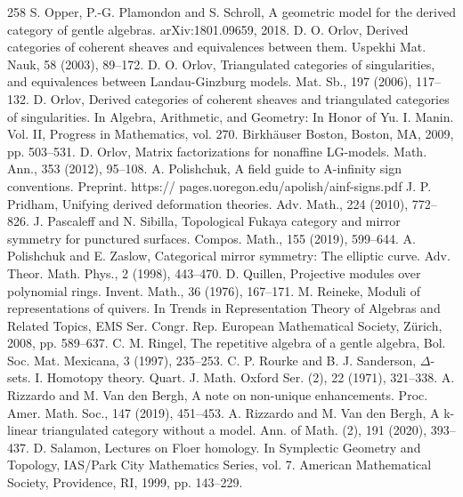 \begin{thebibliography}{258}
\hypertarget{ref:197}{} S. Opper, P.-G. Plamondon and S. Schroll, A geometric model for the derived category of gentle algebras. arXiv:1801.09659, 2018.
\hypertarget{ref:198}{} D. O. Orlov, Derived categories of coherent sheaves and equivalences between them. Uspekhi Mat. Nauk, 58 (2003), 89–172.
\hypertarget{ref:199}{} D. O. Orlov, Triangulated categories of singularities, and equivalences between Landau-Ginzburg models. Mat. Sb., 197 (2006), 117–132.
\hypertarget{ref:200}{} D. Orlov, Derived categories of coherent sheaves and triangulated categories of singularities. In Algebra, Arithmetic, and Geometry: In Honor of Yu. I. Manin. Vol. II, Progress in Mathematics, vol. 270. Birkhäuser Boston, Boston, MA, 2009, pp. 503–531.
\hypertarget{ref:201}{} D. Orlov, Matrix factorizations for nonaffine LG-models. Math. Ann., 353 (2012), 95–108.
\hypertarget{ref:202}{} A. Polishchuk, A field guide to A-infinity sign conventions. Preprint. https:// pages.uoregon.edu/apolish/ainf-signs.pdf
\hypertarget{ref:203}{} J. P. Pridham, Unifying derived deformation theories. Adv. Math., 224 (2010), 772–826.
\hypertarget{ref:204}{} J. Pascaleff and N. Sibilla, Topological Fukaya category and mirror symmetry for punctured surfaces. Compos. Math., 155 (2019), 599–644.
\hypertarget{ref:205}{} A. Polishchuk and E. Zaslow, Categorical mirror symmetry: The elliptic curve. Adv. Theor. Math. Phys., 2 (1998), 443–470.
\hypertarget{ref:206}{} D. Quillen, Projective modules over polynomial rings. Invent. Math., 36 (1976), 167–171.
\hypertarget{ref:207}{} M. Reineke, Moduli of representations of quivers. In Trends in Representation Theory of Algebras and Related Topics, EMS Ser. Congr. Rep. European Mathematical Society, Zürich, 2008, pp. 589–637.
\hypertarget{ref:208}{} C. M. Ringel, The repetitive algebra of a gentle algebra, Bol. Soc. Mat. Mexicana, 3 (1997), 235–253.
\hypertarget{ref:209}{} C. P. Rourke and B. J. Sanderson, $\Delta$-sets. I. Homotopy theory. Quart. J. Math. Oxford Ser. (2), 22 (1971), 321–338.
\hypertarget{ref:210}{} A. Rizzardo and M. Van den Bergh, A note on non-unique enhancements. Proc. Amer. Math. Soc., 147 (2019), 451–453.
\hypertarget{ref:211}{} A. Rizzardo and M. Van den Bergh, A k-linear triangulated category without a model. Ann. of Math. (2), 191 (2020), 393–437.
\hypertarget{ref:212}{} D. Salamon, Lectures on Floer homology. In Symplectic Geometry and Topology, IAS/Park City Mathematics Series, vol. 7. American Mathematical Society, Providence, RI, 1999, pp. 143–229.

\end{thebibliography}
